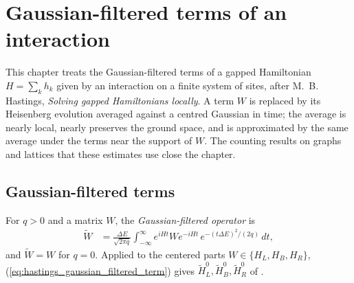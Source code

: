 \chapter{Gaussian-filtered terms of an interaction}
\label{chap:gaussian_filtered_terms}

This chapter treats the Gaussian-filtered terms of a gapped Hamiltonian
$H=\sum_k h_k$ given by an interaction on a finite system of sites, after
M.~B. Hastings, \emph{Solving gapped Hamiltonians locally}. A term $W$ is
replaced by its Heisenberg evolution averaged against a centred Gaussian in
time; the average is nearly local, nearly preserves the ground space, and is
approximated by the same average under the terms near the support of $W$.
The counting results on graphs and lattices that these estimates use close the
chapter.

\section{Gaussian-filtered terms}
\label{sec:gaussian_filtered_lemma1}

\begin{definition}
    \label{def:hastings_gaussian_filtered_term}
    \leanok
    For $q>0$ and a matrix $W$, the \emph{Gaussian-filtered operator} is
    \begin{align}
        \widetilde W & =\frac{\Delta E}{\sqrt{2\pi q}}\int_{-\infty}^{\infty}
        e^{iHt}We^{-iHt}\,e^{-(t\Delta E)^2/(2q)}\,dt,
        \label{eq:hastings_gaussian_filtered_term}
    \end{align}
    and $\widetilde W=W$ for $q=0$. Applied to the centered parts
    $W\in\{H_L,H_B,H_R\}$, (\ref{eq:hastings_gaussian_filtered_term}) gives
    $\tilde H_L^0,\tilde H_B^0,\tilde H_R^0$ of
    \cite[lines 783--793]{Hastings2007AreaLaw}.
\end{definition}

